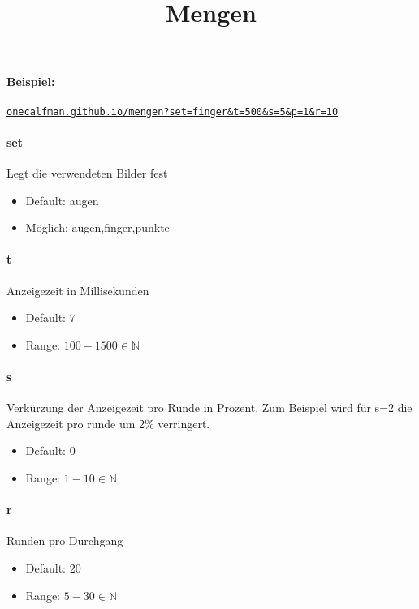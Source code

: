 \documentclass[]{article}
\title{Mengen}
\begin{document}
\maketitle

\paragraph{Beispiel:}
\texttt{\href{onecalfman.github.io/mengen?set=finger\&t=500\&s=5\&p=1\&r=10}{onecalfman.github.io/mengen?set=finger\&t=500\&s=5\&p=1\&r=10}} \\
\begin{multicols}{2}

	\paragraph{set}  Legt die verwendeten Bilder fest
	\begin{itemize}
		\item Default: augen
		\item Möglich: augen,finger,punkte
	\end{itemize}

	\paragraph{t} Anzeigezeit in Millisekunden

	\begin{itemize}
		\item Default: 7
		\item Range: $ 100 - 1500 \in \mathbb{N}$
	\end{itemize}

	\paragraph{s} Verkürzung der Anzeigezeit pro Runde in Prozent. Zum Beispiel wird für s=2 die Anzeigezeit pro runde um 2\% verringert.
	\begin{itemize}
		\item Default: 0
		\item Range: $ 1 - 10 \in \mathbb{N}$
	\end{itemize}

	\paragraph{r}  Runden pro Durchgang
	\begin{itemize}
		\item Default: 20
		\item Range: $ 5 - 30 \in \mathbb{N}$
	\end{itemize}


\end{multicols}
\end{document}

